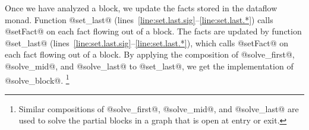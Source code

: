 \documentclass[blockstyle,preprint,natbib,nocopyrightspace]{sigplanconf}
\newcommand\linerangeref[2]{\mbox{lines~\ref{line:#1}--\ref{line:#2}}}
\begin{document}
Once we have analyzed a block, we update the facts stored in
the dataflow monad.
\ifcutting
 Function @set_last@
(\linerangeref{set.last.sig}{set.last.*}) calls @setFact@ on each fact
flowing out of a block.
\else
The facts are updated by function @set_last@
(\linerangeref{set.last.sig}{set.last.*}), which calls @setFact@ on each fact
flowing out of a block.
\fi
By applying the composition
of @solve_first@, @solve_mid@, and @solve_last@ to @set_last@, we get
the implementation of @solve_block@.
\footnote{Similar
  compositions of @solve\_first@, @solve\_mid@, and @solve\_last@
  are used to solve the partial blocks in a graph that is open
  at entry or exit.}
\end{document}
